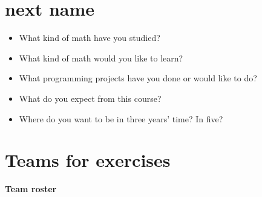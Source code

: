 \documentclass[11pt]{amsart}
\begin{document}
\medskip 

\section*{next name}

\begin{itemize}
\item What kind of math have you studied?
\item What kind of math would you like to learn?
\item What programming projects have you done or would like to do?
\item What do you expect from this course?
\item Where do you want to be in three years' time? In five?
\end{itemize}


\medskip

\newpage
\section*{Teams for exercises}

\begin{center}
  \textbf{\sffamily Team roster}
\end{center}
\end{document}
